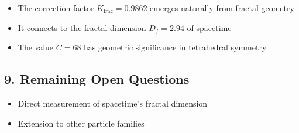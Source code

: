 	\begin{itemize}
		\item The correction factor $K_{\text{frac}} = 0.9862$ emerges naturally from fractal geometry
		\item It connects to the fractal dimension $D_f = 2.94$ of spacetime
		\item The value $C = 68$ has geometric significance in tetrahedral symmetry
	\end{itemize}
	
	\subsection*{9. Remaining Open Questions}
	
	\begin{itemize}
		\item Direct measurement of spacetime's fractal dimension

		\item Extension to other particle families
	\end{itemize}
